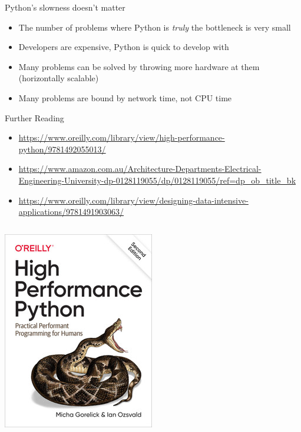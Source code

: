 \documentclass[12pt, aspectration=169]{beamer}
\begin{document}
    \begin{frame}{Python's slowness doesn't matter}
        \begin{itemize}
            \item The number of problems where Python is \textit{truly} the bottleneck is very small
            \item Developers are expensive, Python is quick to develop with
            \item Many problems can be solved by throwing more hardware at them (horizontally scalable)
            \item Many problems are bound by network time, not CPU time
        \end{itemize}
    \end{frame}

    \begin{frame}{Further Reading}
        \begin{itemize}
            \item \url{https://www.oreilly.com/library/view/high-performance-python/9781492055013/}
            \item \url{https://www.amazon.com.au/Architecture-Departments-Electrical-Engineering-University-dp-0128119055/dp/0128119055/ref=dp_ob_title_bk}
            \item \url{https://www.oreilly.com/library/view/designing-data-intensive-applications/9781491903063/}
        \end{itemize}
        \begin{center}
            \begin{columns}
                \includegraphics[scale=0.35]{static/images/HighPerformancePython2ndEdition}

\end{columns}
\end{center}
\end{frame}
\end{document}
